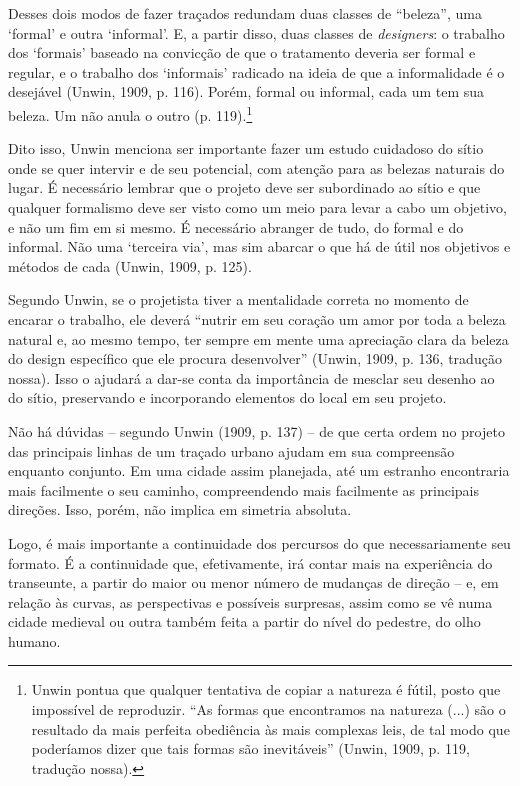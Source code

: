 \documentclass[12pt, a4paper]{book} %
\begin{document}
        Desses dois modos de fazer traçados redundam duas classes de ``beleza'', uma `formal' e outra `informal'. E, a partir disso, duas classes de \textit{designers}: o trabalho dos `formais' baseado na convicção de que o tratamento deveria ser formal e regular, e o trabalho dos `informais' radicado na ideia de que a informalidade é o desejável (Unwin, 1909, p. 116). Porém, formal ou informal, cada um tem sua beleza. Um não anula o outro (p. 119).\footnote[3]{Unwin pontua que qualquer tentativa de copiar a natureza é fútil, posto que impossível de reproduzir. ``As formas que encontramos na natureza (...) são o resultado da mais perfeita obediência às mais complexas leis, de tal modo que poderíamos dizer que tais formas são inevitáveis'' (Unwin, 1909, p. 119, tradução nossa).}

        Dito isso, Unwin menciona ser importante fazer um estudo cuidadoso do sítio onde se quer intervir e de seu potencial, com atenção para as belezas naturais do lugar. É necessário lembrar que o projeto deve ser subordinado ao sítio e que qualquer formalismo deve ser visto como um meio para levar a cabo um objetivo, e não um fim em si mesmo. É necessário abranger de tudo, do formal e do informal. Não uma `terceira via', mas sim abarcar o que há de útil nos objetivos e métodos de cada (Unwin, 1909, p. 125).

        Segundo Unwin, se o projetista tiver a mentalidade correta no momento de encarar o trabalho, ele deverá ``nutrir em seu coração um amor por toda a beleza natural e, ao mesmo tempo, ter sempre em mente uma apreciação clara da beleza do design específico que ele procura desenvolver'' (Unwin, 1909, p. 136, tradução nossa). Isso o ajudará a dar-se conta da importância de mesclar seu desenho ao do sítio, preservando e incorporando elementos do local em seu projeto.

        Não há dúvidas – segundo Unwin (1909, p. 137) – de que certa ordem no projeto das principais linhas de um traçado urbano ajudam em sua compreensão enquanto conjunto. Em uma cidade assim planejada, até um estranho encontraria mais facilmente o seu caminho, compreendendo mais facilmente as principais direções. Isso, porém, não implica em simetria absoluta.

        Logo, é mais importante a continuidade dos percursos do que necessariamente seu formato. É a continuidade que, efetivamente, irá contar mais na experiência do transeunte, a partir do maior ou menor número de mudanças de direção – e, em relação às curvas, as perspectivas e possíveis surpresas, assim como se vê numa cidade medieval ou outra também feita a partir do nível do pedestre, do olho humano.
\end{document}
